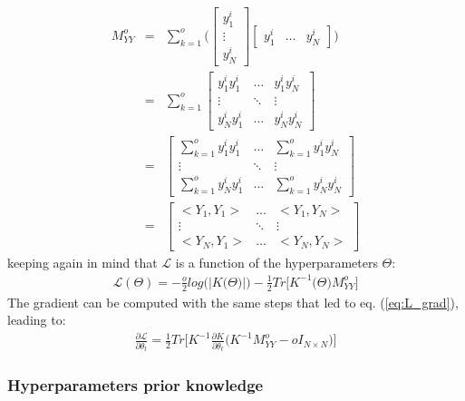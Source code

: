 \documentclass{article}
\begin{document}
\begin{eqnarray}
M^o_{YY} 
&=& \sum_{k=1}^o \bigg (
\begin{bmatrix} y^i_1 \\ \vdots \\ y^i_N \end{bmatrix}
\begin{bmatrix} y^i_1 & \hdots & y^i_N \end{bmatrix}
\bigg ) \\
&=& \sum_{k=1}^o 
\begin{bmatrix}
y^i_1 y^i_1 & \hdots & y^i_1 y^i_N \\ 
\vdots & \ddots & \vdots \\ 
y^i_N y^i_1 & \hdots & y^i_N y^i_N
\end{bmatrix} \\
&=& \begin{bmatrix}
\sum_{k=1}^o y^i_1 y^i_1 & \hdots & \sum_{k=1}^o y^i_1 y^i_N \\ 
\vdots & \ddots & \vdots \\ 
\sum_{k=1}^o y^i_N y^i_1 & \hdots & \sum_{k=1}^o y^i_N y^i_N
\end{bmatrix} \\
&=& \begin{bmatrix}
<Y_1, Y_1> & \hdots  & <Y_1, Y_N> \\ 
\vdots & \ddots & \vdots \\ 
<Y_N, Y_1> & \hdots & <Y_N, Y_N>
\end{bmatrix}
\end{eqnarray}
keeping again in mind that $\mathcal{L}$ is a function of the hyperparameters $\Theta$:
\begin{eqnarray}
\mathcal{L}(\Theta) = -\frac{o}{2} log \big (\left | K \big (\Theta \big ) \right | \big )
-\frac{1}{2} Tr \bigg [
K^{-1}\big (\Theta \big ) M^o_{YY}
\bigg ] 
\end{eqnarray}
The gradient can be computed with the same steps that led to 
eq. (\ref{eq:L_grad}), leading to:
\begin{eqnarray}
\frac{\partial \mathcal{L}}{\partial \theta_t} = \frac{1}{2} Tr \bigg [ K^{-1} \frac{\partial K}{\partial \theta_t} \bigg (K^{-1} M^o_{YY} - o I_{N \times N} \bigg ) \bigg ]
\end{eqnarray}

\subsubsection{Hyperparameters prior knowledge}
\label{sec:prior}
\end{document}

